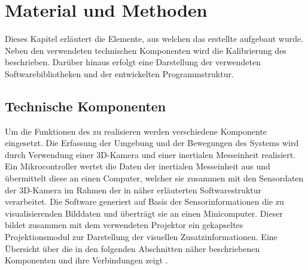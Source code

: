 \chapter{Material und Methoden}
\label{chap.material}
Dieses Kapitel erläutert die Elemente, aus welchen das erstellte \kps{} aufgebaut wurde. Neben den verwendeten technischen Komponenten wird die Kalibrierung des  beschrieben. Darüber hinaus erfolgt eine Darstellung der verwendeten Softwarebibliotheken und der entwickelten Programmstruktur.

\section{Technische Komponenten}
Um die Funktionen des  zu realisieren werden verschiedene Komponente eingesetzt. Die Erfassung der Umgebung und der Bewegungen des Systems wird durch Verwendung einer 3D-Kamera und einer inertialen Messeinheit realisiert. Ein Mikrocontroller wertet die Daten der inertialen Messeinheit aus und übermittelt diese an einen Computer, welcher sie zusammen mit den Sensordaten der 3D-Kamera im Rahmen der in  näher erläuterten Softwarestruktur verarbeitet. Die Software generiert auf Basis der Sensorinformationen die zu visualisierenden Bilddaten und überträgt sie an einen Minicomputer. Dieser bildet zusammen mit dem verwendeten Projektor ein gekapseltes Projektionsmodul zur Darstellung der visuellen Zusatzinformationen. Eine Übersicht über die in den folgenden Abschnitten näher beschriebenen Komponenten und ihre Verbindungen zeigt .\\

